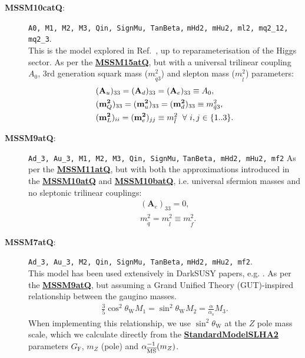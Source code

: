 \documentclass[pdftex,twocolumn,epjc3_preprint,runningheads]{svjour3}
\renewcommand{\_}{\discretionary{\underscore}{}{\underscore}}
\newcommand\term[1]{{\lstset{style=terminal}\lstinline!#1!\lstset{style=cpp}}}
\newcommand{\doublecrosssf}[2]{\hyperref[#2]{\textbf{\textsf{#1}}}}
\newcommand{\gsfitemc}[1]{\item[\textbf{\textsf{#1}}\label{#1}:]}
\newcommand{\ds}{\textsf{DarkSUSY}\xspace}
\begin{document}
\begin{description}
\gsfitemc{MSSM10catQ} \term{A0, M1, M2, M3, Qin, SignMu, TanBeta,}
                      \term{mHd2, mHu2, ml2, mq2_12, mq2_3}.\\
This is the model explored in Ref.\ \cite{MasterCodeMSSM10}, up to reparameterisation of the Higgs sector.  As per the \doublecrosssf{MSSM15atQ}{MSSM15atQ}, but with a universal trilinear coupling $A_0$, 3rd generation squark mass ($m_{\tilde q3}^2$) and slepton mass ($m_{\tilde l}^2$) parameters:
\begin{align}
&(\mathbf{A}_u)_{33} = (\mathbf{A}_d)_{33} = (\mathbf{A}_e)_{33} \equiv A_0,\\
&(\mathbf{m}^\mathbf{2}_Q)_{33} = (\mathbf{m}^\mathbf{2}_u)_{33} = (\mathbf{m}^\mathbf{2}_d)_{33} \equiv m_{\tilde q3}^2,\\
&(\mathbf{m}^\mathbf{2}_L)_{ii} = (\mathbf{m}^\mathbf{2}_e)_{jj} \equiv m_{\tilde l}^2 \hspace{2mm} \forall\ i,j\in\{1..3\}.
\end{align}

\gsfitemc{MSSM9atQ} \term{Ad_3, Au_3, M1, M2, M3, Qin, SignMu,}
                    \term{TanBeta, mHd2, mHu2, mf2}
As per the \doublecrosssf{MSSM11atQ}{MSSM11atQ}, but with both the approximations introduced in the \doublecrosssf{MSSM10atQ}{MSSM10atQ} and \doublecrosssf{MSSM10batQ}{MSSM10batQ}, i.e. universal sfermion masses and no sleptonic trilinear couplings:
\begin{align}
&(\mathbf{A}_e)_{33} = 0,\\
&m_{\tilde q}^2 = m_{\tilde l}^2 \equiv m_{\tilde f}^2.
\end{align}

\gsfitemc{MSSM7atQ} \term{Ad_3, Au_3, M2, Qin, SignMu, TanBeta,}
                    \term{mHd2, mHu2, mf2}.\\
This model has been used extensively in \ds papers, e.g. \cite{BergstromGondolo96,darksusy,BMSSM}.  As per the \doublecrosssf{MSSM9atQ}{MSSM9atQ}, but assuming a Grand Unified Theory (GUT)-inspired relationship between the gaugino masses.
\begin{align}
\frac{3}{5}\cos^2\theta_\mathrm{W}M_1 = \sin^2\theta_\mathrm{W}M_2 = \frac{\alpha}{\alpha_\mathrm{s}}M_3.
\end{align}
When implementing this relationship, we use $\sin^2\theta_\mathrm{W}$ at the $Z$ pole mass scale, which we calculate directly from the \doublecrosssf{StandardModel\_SLHA2}{SM_SLHA2} parameters $G_\mathrm{F}$, $m_Z$ (pole) and $\alpha^{-1}_{\overline{\rm MS}}(m_Z)$.

\end{description}
\end{document}
